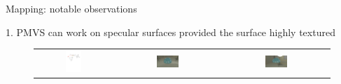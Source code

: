 \documentclass[10pt]{beamer}
\begin{document}
\begin{frame}{Mapping: notable observations}

\begin{exampleblock}{1. PMVS can work on specular surfaces provided the surface highly textured}
\begin{figure}
\begin{tabular}{ccc}
\includegraphics[width=0.22\textwidth]{mapping/mvs_spec/mvs_spec}&
\includegraphics[width=0.22\textwidth]{mapping/mvs_spec/mvs_spec_01}&
\includegraphics[width=0.22\textwidth]{mapping/mvs_spec/mvs_spec_00}\\
\end{tabular}
\end{figure}
\end{exampleblock}


\end{frame}
\end{document}
